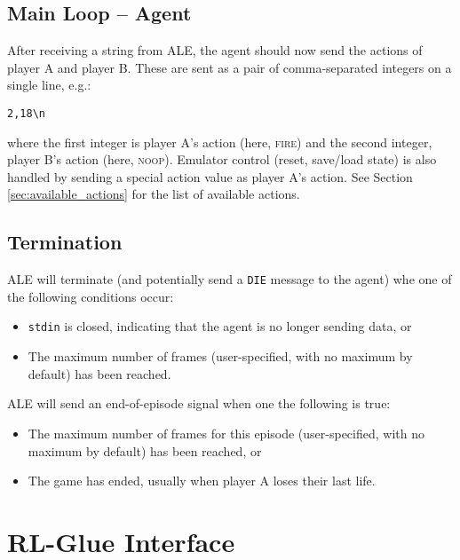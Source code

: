 \documentclass[12pt]{article}
\begin{document}
\subsection{Main Loop -- Agent}

After receiving a string from ALE, the agent should now send the actions of player A and player B.
These are sent as a pair of comma-separated integers on a single line, e.g.:

\begin{verbatim}
2,18\n
\end{verbatim}

where the first integer is player A's action (here, \textsc{fire}) and the second integer, player B's action (here, \textsc{noop}). Emulator control (reset, save/load state) is also handled by sending a special action value as player A's action. See Section \ref{sec:available_actions} for the list of available actions.

\subsection{Termination}\label{subsec:termination_conditions}

ALE will terminate (and potentially send a \verb+DIE+ message to the agent) whe one of the following conditions occur:

\begin{itemize}
  \item{\texttt{stdin} is closed, indicating that the agent is no longer sending data, or}
  \item{The maximum number of frames (user-specified, with no maximum by default) has been reached.}
\end{itemize}

ALE will send an end-of-episode signal when one the following is true:

\begin{itemize}
  \item{The maximum number of frames for this episode (user-specified, with no maximum by default) has been reached, or}
  \item{The game has ended, usually when player A loses their last life.}
\end{itemize}

\section{RL-Glue Interface}\label{sec:rlglue_interface}
\end{document}
